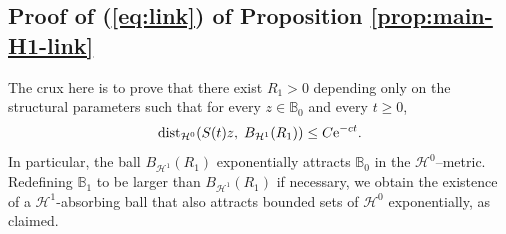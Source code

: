 \documentclass[12pt,leqno]{amsart}
\def\e{{\rm e}}
\def\dist{{\rm dist}}
\theoremstyle{definition}
\numberwithin{equation}{section}
\numberwithin{figure}{section}
\begin{document}
\subsection{Proof of (\ref{eq:link}) of Proposition \ref{prop:main-H1-link}} 
The crux here is to prove that there exist  $R_1>0$  depending only on the structural parameters such that for every $z\in \mathbb B_0$ and every $t\ge 0$,
\begin{equation}\label{eq:exp-attraction}
\dist_{\mathcal H^0} (S(t)z,\; B_{\mathcal H^1}(R_1)) \le C\e^{-c t}.
\end{equation}
In particular, the ball $B_{\mathcal H^1}(R_1)$ exponentially attracts $\mathbb B_0$ in the $\mathcal H^0$--metric. Redefining $\mathbb  B_1$ to be larger than $B_{\mathcal H^1}(R_1)$ if necessary, we obtain the existence of a $\mathcal H^1 $-absorbing ball that also attracts bounded sets of $\mathcal H^0$ exponentially, as claimed.
\end{document}
